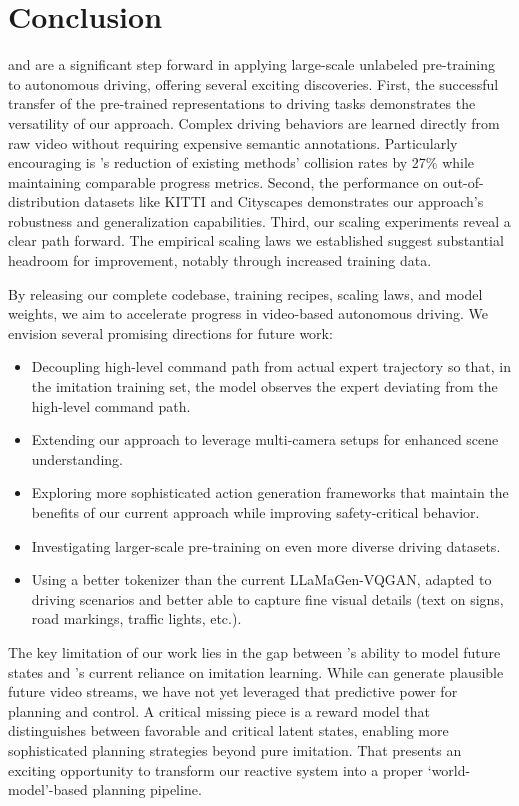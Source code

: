 \section{Conclusion}
\label{sec:conclusion}

\vm{} and \vam{} are a significant step forward in applying large-scale unlabeled pre-training to autonomous driving, offering several exciting discoveries. 
%
First, the successful transfer of the pre-trained representations to driving tasks demonstrates the versatility of our approach. Complex driving behaviors are learned directly from raw video without requiring expensive semantic annotations. Particularly encouraging is \vam{}'s reduction of existing methods' collision rates by 27\% while maintaining comparable progress metrics.
%
Second, the performance on out-of-distribution datasets like KITTI and Cityscapes demonstrates our approach's robustness and generalization capabilities.
%
Third, our scaling experiments reveal a clear path forward. The empirical scaling laws we established suggest substantial headroom for improvement, notably through increased training data.

By releasing our complete codebase, training recipes, scaling laws, and model weights, we aim to accelerate progress in video-based autonomous driving. We envision several promising directions for future work:
\begin{itemize}
    \item Decoupling high-level command path from actual expert trajectory so that, in the imitation training set, the model observes the expert deviating from the high-level command path.
    \item Extending our approach to leverage multi-camera setups for enhanced scene understanding.
    \item Exploring more sophisticated action generation frameworks that maintain the benefits of our current approach while improving safety-critical behavior.
    \item Investigating larger-scale pre-training on even more diverse driving datasets.
    \item Using a better tokenizer than the current LLaMaGen-VQGAN, adapted to driving scenarios and better able to capture fine visual details (text on signs, road markings, traffic lights, etc.).
\end{itemize}

The key limitation of our work lies in the gap between \vm{}'s ability to model future states and \vam{}'s current reliance on imitation learning. While \vm{} can generate plausible future video streams, we have not yet leveraged that predictive power for planning and control. A critical missing piece is a reward model that distinguishes between favorable and critical latent states, enabling more sophisticated planning strategies beyond pure imitation. That presents an exciting opportunity to transform our reactive system into a proper `world-model'-based planning pipeline.

